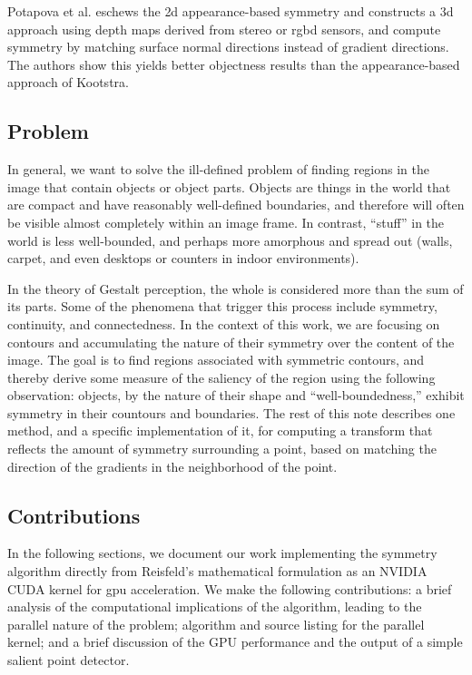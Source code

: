 Potapova et al.\cite{potapova_local_2012} eschews the \gls{2d} appearance-based symmetry and constructs a \gls{3d} approach using depth maps derived from stereo or \gls{rgbd} sensors, and compute symmetry by matching surface normal directions instead of gradient directions. The authors show this yields better objectness results than the appearance-based approach of Kootstra.

\subsection{Problem}
\label{sec:problem}

In general, we want to solve the ill-defined problem of finding regions in the image that contain objects or object parts. Objects are things in the world that are compact and have reasonably well-defined boundaries, and therefore will often be visible almost completely within an image frame. In contrast, ``stuff'' in the world is less well-bounded, and perhaps more amorphous and spread out (\eg walls, carpet, and even desktops or counters in indoor environments).

In the theory of Gestalt perception, the whole is considered more than the sum of its parts\cite{jakel_overview_2016}. Some of the phenomena that trigger this process include symmetry, continuity, and connectedness. In the context of this work, we are focusing on contours and accumulating the nature of their symmetry over the content of the image. The goal is to find regions associated with symmetric contours, and thereby derive some measure of the saliency of the region using the following observation: objects, by the nature of their shape and ``well-boundedness,'' exhibit symmetry in their countours and boundaries. The rest of this note describes one method, and a specific implementation of it, for computing a transform that reflects the amount of symmetry surrounding a point, based on matching the direction of the gradients in the neighborhood of the point. 

\subsection{Contributions}
\label{sec:contributions}

In the following sections, we document our work implementing the symmetry algorithm directly from Reisfeld's mathematical formulation as an NVIDIA CUDA kernel for \gls{gpu} acceleration. We make the following contributions: a brief analysis of the computational implications of the algorithm, leading to the parallel nature of the problem; algorithm and source listing for the parallel kernel; and a brief discussion of the GPU performance and the output of a simple salient point detector. 

